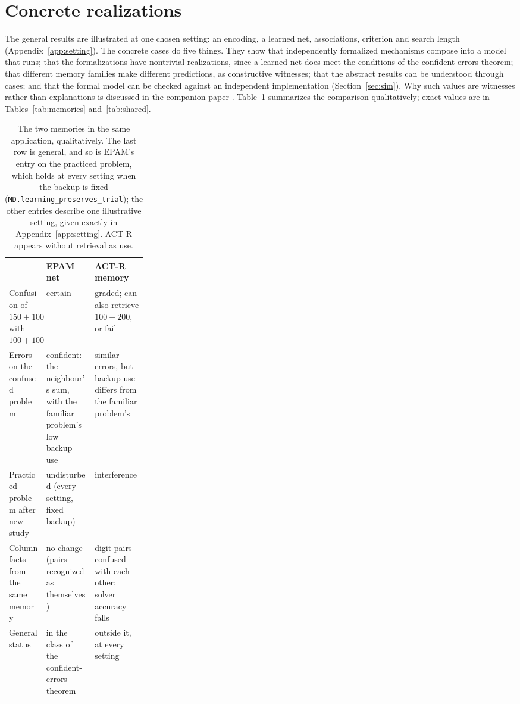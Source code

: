 \documentclass[11pt]{article}
\newcommand{\lean}[1]{\texttt{#1}}
\begin{document}
\section{Concrete realizations}
\label{sec:concrete}

The general results are illustrated at one chosen setting: an encoding, a learned net, associations, criterion and search length (Appendix~\ref{app:setting}). The concrete cases do five things. They show that independently formalized mechanisms compose into a model that runs; that the formalizations have nontrivial realizations, since a learned net does meet the conditions of the confident-errors theorem; that different memory families make different predictions, as constructive witnesses; that the abstract results can be understood through cases; and that the formal model can be checked against an independent implementation (Section~\ref{sec:sim}). Why such values are witnesses rather than explanations is discussed in the companion paper \citep{shrager2026coglean}. Table~\ref{tab:qual} summarizes the comparison qualitatively; exact values are in Tables~\ref{tab:memories} and~\ref{tab:shared}.

\begin{table}[t]
\centering
\small
\begin{tabularx}{\linewidth}{@{}>{\raggedright\arraybackslash}p{0.27\linewidth}>{\raggedright\arraybackslash}X>{\raggedright\arraybackslash}X@{}}
\toprule
& EPAM net & ACT-R memory \\
\midrule
Confusion of $150+100$ with $100+100$ & certain & graded; can also retrieve $100+200$, or fail \\
Errors on the confused problem & confident: the neighbour's sum, with the familiar problem's low backup use & similar errors, but backup use differs from the familiar problem's \\
Practiced problem after new study & undisturbed (every setting, fixed backup) & interference \\
Column facts from the same memory & no change (pairs recognized as themselves) & digit pairs confused with each other; solver accuracy falls \\
General status & in the class of the confident-errors theorem & outside it, at every setting \\
\bottomrule
\end{tabularx}
\caption{The two memories in the same application, qualitatively. The last row is general, and so is EPAM's entry on the practiced problem, which holds at every setting when the backup is fixed (\lean{MD.learning\_preserves\_trial}); the other entries describe one illustrative setting, given exactly in Appendix~\ref{app:setting}. ACT-R appears without retrieval as use.}
\label{tab:qual}
\end{table}
\end{document}
